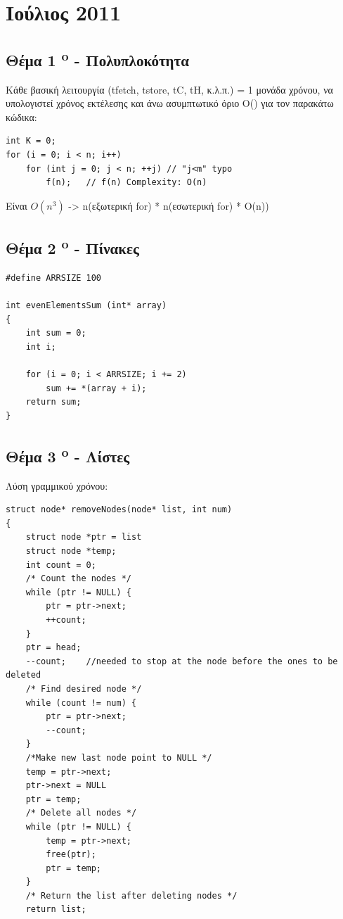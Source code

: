 \documentclass[a4paper,10pt]{article}
\begin{document}

\section{Ιούλιος 2011}

\subsection{Θέμα 1 \textsuperscript{o} - Πολυπλοκότητα}
Κάθε βασική λειτουργία (tfetch, tstore, tC, tH, κ.λ.π.) = 1 μονάδα χρόνου, να
υπολογιστεί χρόνος εκτέλεσης και άνω ασυμπτωτικό όριο Ο() για τον παρακάτω
κώδικα:

\begin{verbatim}
int K = 0;
for (i = 0; i < n; i++)
    for (int j = 0; j < n; ++j) // "j<m" typo
        f(n);   // f(n) Complexity: O(n)
\end{verbatim}
Είναι $O(n^3)$ -> n(εξωτερική for) * n(εσωτερική for) * O(n))

\subsection{Θέμα 2 \textsuperscript{o} - Πίνακες}
\begin{verbatim}
#define ARRSIZE 100

int evenElementsSum (int* array)
{
    int sum = 0;
    int i;

    for (i = 0; i < ARRSIZE; i += 2)
        sum += *(array + i);
    return sum;
}
\end{verbatim}


\subsection{Θέμα 3 \textsuperscript{o} - Λίστες}
Λύση γραμμικού χρόνου:
\begin{verbatim}
struct node* removeNodes(node* list, int num)
{
    struct node *ptr = list
    struct node *temp;
    int count = 0;
    /* Count the nodes */
    while (ptr != NULL) {
        ptr = ptr->next;
        ++count;
    }
    ptr = head;
    --count;    //needed to stop at the node before the ones to be deleted
    /* Find desired node */
    while (count != num) {
        ptr = ptr->next;
        --count;
    }
    /*Make new last node point to NULL */
    temp = ptr->next;
    ptr->next = NULL
    ptr = temp;
    /* Delete all nodes */
    while (ptr != NULL) {
        temp = ptr->next;
        free(ptr);
        ptr = temp;
    }
    /* Return the list after deleting nodes */
    return list;
\end{verbatim}
\end{document}
